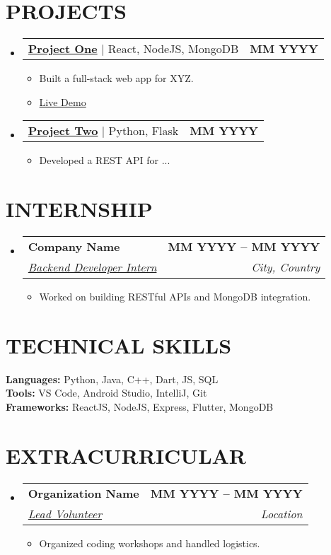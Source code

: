 \documentclass[letterpaper,11pt]{article}
\makeatletter
\newcommand{\resumeItem}[1]{
    \item\small{
            {#1 \vspace{-2pt}}
    }
}
\newcommand{\resumeSubheading}[4]{
    \vspace{-2pt}\item
    \begin{tabular*}{1.0\textwidth}[t]{l@{\extracolsep{\fill}}r}
        \textbf{\large#1} & \textbf{\small #2} \\
        \textit{\large#3} & \textit{\small #4} \\
    \end{tabular*}\vspace{-7pt}
}
\newcommand{\resumeProjectHeading}[2]{
    \item
    \begin{tabular*}{1.001\textwidth}{l@{\extracolsep{\fill}}r}
        \small#1 & \textbf{\small #2}\\
    \end{tabular*}\vspace{-7pt}
}
\newcommand{\resumeSubHeadingListStart}{\begin{itemize}[leftmargin=0.0in, label={}]}
\newcommand{\resumeSubHeadingListEnd}{\end{itemize}}
\newcommand{\resumeItemListStart}{\begin{itemize}}
\newcommand{\resumeItemListEnd}{\end{itemize}\vspace{-5pt}}
\makeatother
\begin{document}
\section{PROJECTS}
\resumeSubHeadingListStart
\resumeProjectHeading
{\href{https://projectlink.com}{\textbf{Project One}} $|$ React, NodeJS, MongoDB}{MM YYYY}
\resumeItemListStart
\resumeItem{Built a full-stack web app for XYZ.}
\resumeItem{\href{https://liveproject.com}{Live Demo}}
\resumeItemListEnd

\resumeProjectHeading
{\href{https://projectlink.com}{\textbf{Project Two}} $|$ Python, Flask}{MM YYYY}
\resumeItemListStart
\resumeItem{Developed a REST API for ...}
\resumeItemListEnd
\resumeSubHeadingListEnd

\section{INTERNSHIP}
\resumeSubHeadingListStart
\resumeSubheading
{Company Name \href{https://certificate.com}{\faExternalLink}}{MM YYYY -- MM YYYY}
{\underline{Backend Developer Intern}}{City, Country}
\resumeItemListStart
\resumeItem{Worked on building RESTful APIs and MongoDB integration.}
\resumeItemListEnd
\resumeSubHeadingListEnd

\section{TECHNICAL SKILLS}
\begin{itemize}[leftmargin=0.15in, label={}]
\small{\item{
\textbf{Languages:} Python, Java, C++, Dart, JS, SQL \\
\textbf{Tools:} VS Code, Android Studio, IntelliJ, Git \\
\textbf{Frameworks:} ReactJS, NodeJS, Express, Flutter, MongoDB \\
}}
\end{itemize}

\section{EXTRACURRICULAR}
\resumeSubHeadingListStart
\resumeSubheading
{Organization Name \href{https://certificate.com}{\faExternalLink}}{MM YYYY -- MM YYYY}
{\underline{Lead Volunteer}}{Location}
\resumeItemListStart
\resumeItem{Organized coding workshops and handled logistics.}
\resumeItemListEnd
\resumeSubHeadingListEnd
\end{document}
